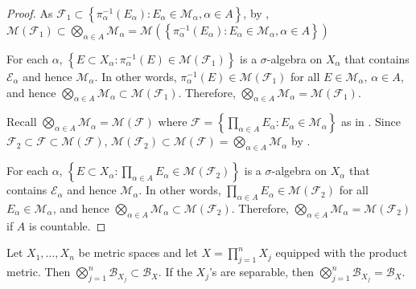 \begin{proof}
    As $\mathcal{F}_1 \subset \left\{ \pi_{\alpha}^{-1} (E_\alpha) : E_{\alpha} \in \mathcal{M}_{\alpha}, \alpha \in A \right\}$, by , $\mathcal{M}(\mathcal{F}_1) \subset \bigotimes_{\alpha \in A} \mathcal{M}_{\alpha} = \mathcal{M} \left( \left\{ \pi_{\alpha}^{-1} (E_\alpha) : E_{\alpha} \in \mathcal{M}_{\alpha}, \alpha \in A \right\} \right)$

    For each $\alpha$, $\left\{ E \subset X_\alpha: \pi_{\alpha}^{-1}(E) \in \mathcal{M}(\mathcal{F}_1) \right\}$ is a $\sigma$-algebra on $X_\alpha$ that contains $\mathcal{E}_\alpha$ and hence $\mathcal{M}_\alpha$.
    In other words, $\pi_{\alpha}^{-1}(E) \in \mathcal{M}(\mathcal{F}_1)$ for all $E \in \mathcal{M}_{\alpha}$, $\alpha \in A$, and hence $\bigotimes_{\alpha \in A} \mathcal{M}_{\alpha} \subset \mathcal{M}(\mathcal{F}_1)$.
    Therefore, $\bigotimes_{\alpha \in A} \mathcal{M}_{\alpha} = \mathcal{M}(\mathcal{F}_1)$.

    Recall $\bigotimes_{\alpha \in A} \mathcal{M}_{\alpha} = \mathcal{M}(\mathcal{F})$ where $\mathcal{F} = \left\{ \prod_{\alpha \in A} E_{\alpha} : E_{\alpha} \in \mathcal{M}_{\alpha} \right\}$ as in .
    Since $\mathcal{F}_2 \subset \mathcal{F} \subset \mathcal{M}(\mathcal{F})$, $\mathcal{M}(\mathcal{F}_2) \subset \mathcal{M}(\mathcal{F}) = \bigotimes_{\alpha \in A} \mathcal{M}_{\alpha} $ by .

    For each $\alpha$, $\left\{ E \subset X_\alpha: \prod_{\alpha \in A} E_\alpha \in \mathcal{M}(\mathcal{F}_2) \right\}$ is a $\sigma$-algebra on $X_\alpha$ that contains $\mathcal{E}_\alpha$ and hence $\mathcal{M}_\alpha$.
    In other words, $\prod_{\alpha \in A} E_\alpha \in \mathcal{M}(\mathcal{F}_2)$ for all $E_{\alpha} \in \mathcal{M}_{\alpha}$, and hence $\bigotimes_{\alpha \in A} \mathcal{M}_{\alpha} \subset \mathcal{M}(\mathcal{F}_2)$.
    Therefore, $\bigotimes_{\alpha \in A} \mathcal{M}_{\alpha} = \mathcal{M}(\mathcal{F}_2)$ if $A$ is countable.
\end{proof}

\begin{proposition}
    Let $X_1, \dots, X_n$ be metric spaces and let $X = \prod_{j=1}^{n} X_j$ equipped with the product metric.
    Then $\bigotimes_{j=1}^{n} \mathcal{B}_{X_j} \subset \mathcal{B}_{X}$.
    If the $X_j$'s are separable, then $\bigotimes_{j=1}^{n} \mathcal{B}_{X_j} = \mathcal{B}_{X}$.
\end{proposition}

